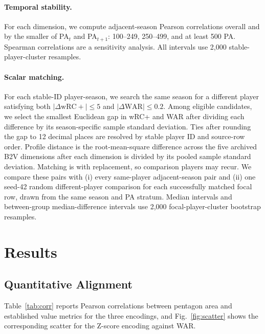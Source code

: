 \documentclass[10pt,twocolumn,letterpaper]{article}
\begin{document}
\paragraph{Temporal stability.}
For each dimension, we compute adjacent-season Pearson correlations overall and by the smaller of PA$_t$ and PA$_{t+1}$: 100--249, 250--499, and at least 500 PA. Spearman correlations are a sensitivity analysis. All intervals use 2{,}000 stable-player-cluster resamples.

\paragraph{Scalar matching.}
For each stable-ID player-season, we search the same season for a different player satisfying both $|\Delta\mathrm{wRC+}|\leq5$ and $|\Delta\mathrm{WAR}|\leq0.2$. Among eligible candidates, we select the smallest Euclidean gap in wRC+ and WAR after dividing each difference by its season-specific sample standard deviation. Ties after rounding the gap to 12 decimal places are resolved by stable player ID and source-row order. Profile distance is the root-mean-square difference across the five archived B2V dimensions after each dimension is divided by its pooled sample standard deviation. Matching is with replacement, so comparison players may recur. We compare these pairs with (i) every same-player adjacent-season pair and (ii) one seed-42 random different-player comparison for each successfully matched focal row, drawn from the same season and PA stratum. Median intervals and between-group median-difference intervals use 2{,}000 focal-player-cluster bootstrap resamples.

\section{Results}
\label{sec:results}

\subsection{Quantitative Alignment}
Table~\ref{tab:corr} reports Pearson correlations between pentagon area and established value metrics for the three encodings, and Fig.~\ref{fig:scatter} shows the corresponding scatter for the Z-score encoding against WAR.

\begin{table}[t]
\centering
\caption{Pearson correlation between pentagon area and established value metrics, by encoding scheme (2021--2025, $n=2{,}309$ season-rows). Brackets are 95\% confidence intervals from a player-level cluster bootstrap (2{,}000 resamples; players, not season-rows, are the resampling unit, since a player's several seasons are not independent draws). A paired bootstrap on the same resamples confirms Z-score's advantage over PCA, though only 0.01--0.02 in magnitude, is statistically significant (95\% CI on the difference excludes 0) for all three metrics; the larger gap to JointVAE (0.05--0.16) is significant a fortiori.}
\label{tab:corr}
\small

\end{table}
\end{document}
